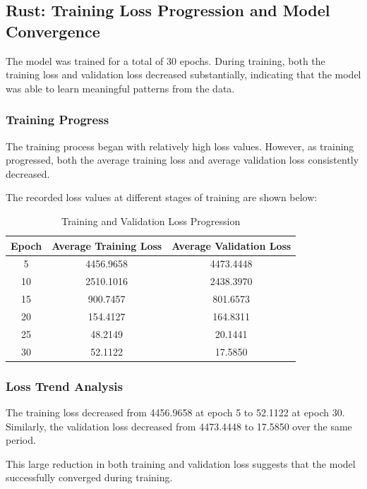 \documentclass[10pt,a4paper,twocolumn]{article}
\begin{document}
\subsection{Rust: Training Loss Progression and Model Convergence}

The model was trained for a total of 30 epochs. During training, both the training loss and validation loss decreased substantially, indicating that the model was able to learn meaningful patterns from the data.

\subsubsection{Training Progress}

The training process began with relatively high loss values. However, as training progressed, both the average training loss and average validation loss consistently decreased.

The recorded loss values at different stages of training are shown below:

\begin{table}[t!]
\centering
\caption{Training and Validation Loss Progression}
\begin{tabular}{|c|c|c|}
\hline
\textbf{Epoch} & \textbf{Average Training Loss} & \textbf{Average Validation Loss} \\
\hline
5  & 4456.9658 & 4473.4448 \\
10 & 2510.1016 & 2438.3970 \\
15 & 900.7457  & 801.6573 \\
20 & 154.4127  & 164.8311 \\
25 & 48.2149   & 20.1441 \\
30 & 52.1122   & 17.5850 \\
\hline
\end{tabular}
\label{tab:loss_progression}
\end{table}

\subsubsection{Loss Trend Analysis}

The training loss decreased from 4456.9658 at epoch 5 to 52.1122 at epoch 30. Similarly, the validation loss decreased from 4473.4448 to 17.5850 over the same period.

This large reduction in both training and validation loss suggests that the model successfully converged during training.
\end{document}
